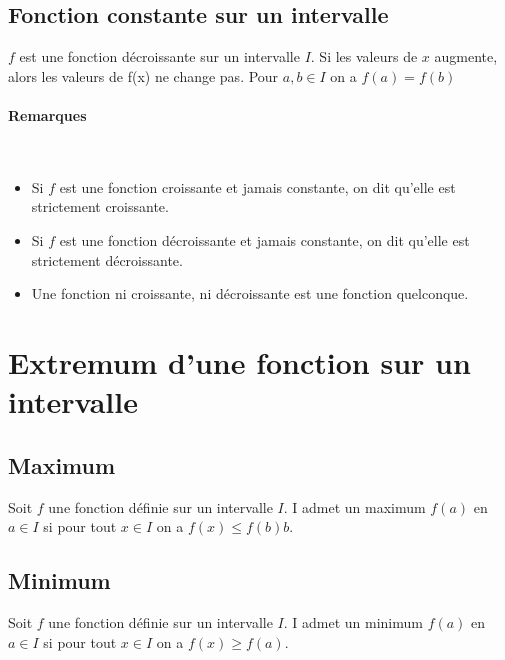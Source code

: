 \documentclass[paper=a4, fontsize=9pt]{scrartcl} %
\begin{document}
\subsection{Fonction constante sur un intervalle}

\begin{Proposition} $f$ est une fonction décroissante sur un intervalle $I$.
  Si les valeurs de $x$ augmente, alors les valeurs de f(x) ne change pas. Pour $a,b \in I$ on a $f(a) = f(b)$
\end{Proposition}

\paragraph{Remarques}~~\\
\begin{itemize}
\item Si $f$ est une fonction croissante et jamais constante, on dit qu'elle est strictement croissante.
\item Si $f$ est une fonction décroissante et jamais constante, on dit qu'elle est strictement décroissante.
\item Une fonction ni croissante, ni décroissante est une fonction quelconque.
\end{itemize}

\section{Extremum d'une fonction sur un intervalle}
\begin{multicols}{2}
  \subsection{Maximum}

  \begin{Definition}
    Soit $f$ une fonction définie sur un intervalle $I$. I admet un maximum $f(a)$ en $a \in I$ si pour tout $x \in I$ on a $f(x) \leq f(b)b$.  
  \end{Definition}

  \subsection{Minimum}

  \begin{Definition}
    Soit $f$ une fonction définie sur un intervalle $I$. I admet un minimum $f(a)$ en $a \in I$ si pour tout $x \in I$ on a $f(x) \geq f(a)$.  
  \end{Definition}
\end{multicols}
\end{document}
